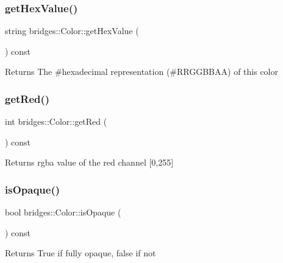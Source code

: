 \subsubsection{\texorpdfstring{get\+Hex\+Value()}{getHexValue()}}
{\footnotesize\ttfamily string bridges\+::\+Color\+::get\+Hex\+Value (\begin{DoxyParamCaption}{ }\end{DoxyParamCaption}) const\hspace{0.3cm}{\ttfamily [inline]}}

\begin{DoxyReturn}{Returns}
The \#hexadecimal representation (\#\+R\+R\+G\+G\+B\+B\+AA) of this color 
\end{DoxyReturn}
\mbox{\label{classbridges_1_1_color_a4c81e33854a6fdba9a3030e97ec8609e}} 
\subsubsection{\texorpdfstring{get\+Red()}{getRed()}}
{\footnotesize\ttfamily int bridges\+::\+Color\+::get\+Red (\begin{DoxyParamCaption}{ }\end{DoxyParamCaption}) const\hspace{0.3cm}{\ttfamily [inline]}}

\begin{DoxyReturn}{Returns}
rgba value of the red channel \mbox{[}0,255\mbox{]} 
\end{DoxyReturn}
\mbox{\label{classbridges_1_1_color_ae55f3077cb3bd93386dc11eaeecf823c}} 
\subsubsection{\texorpdfstring{is\+Opaque()}{isOpaque()}}
{\footnotesize\ttfamily bool bridges\+::\+Color\+::is\+Opaque (\begin{DoxyParamCaption}{ }\end{DoxyParamCaption}) const\hspace{0.3cm}{\ttfamily [inline]}}

\begin{DoxyReturn}{Returns}
True if fully opaque, false if not 
\end{DoxyReturn}
\mbox{\label{classbridges_1_1_color_a56b0d17239aafa0cea7f43e5358cf4c0}} 
